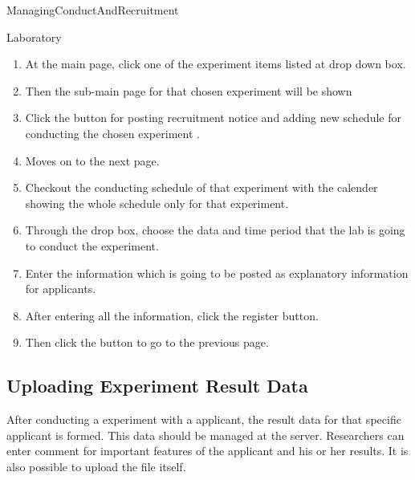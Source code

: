 \documentclass[letterpaper, 10 pt, conference]{ieeeconf}  %
\begin{document}
ManagingConductAndRecruitment\\

Laboratory\\

\begin{enumerate}
    \item At the main page, click one of the experiment items listed at drop down box.
    \item Then the sub-main page for that chosen experiment will be shown
\item Click the button for posting recruitment notice and adding new schedule for conducting the chosen experiment .
\item Moves on to the next page. 
\item Checkout the conducting schedule of that experiment with the calender showing the whole schedule only for that experiment. 
\item Through the drop box, choose the data and time period that the lab is going to conduct the experiment. 
\item Enter the information which is going to be posted as explanatory information  for applicants. 
\item After entering all the information, click the register button.
\item Then click the button to go to the previous page.
    
\end{enumerate}

\subsection{Uploading Experiment Result Data}
After conducting a experiment with a applicant, the result data for that specific applicant is formed. This data should be managed at the server. Researchers can enter comment for important features of the applicant and his or her results. It is also possible to upload the file itself.\\
\end{document}

